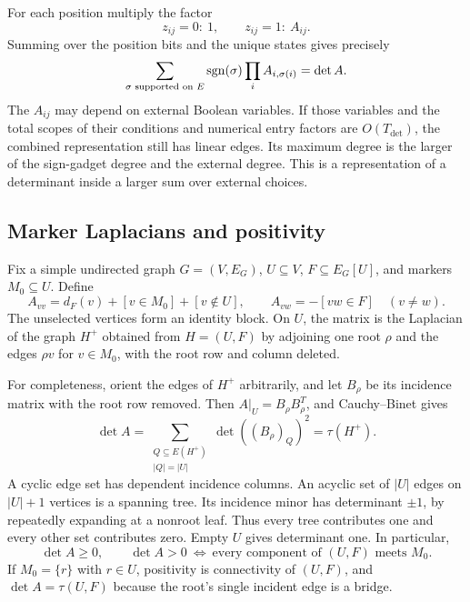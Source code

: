 For each position multiply the factor
\[
 z_{ij}=0:\ 1,\qquad z_{ij}=1:\ A_{ij}.
\]
Summing over the position bits and the unique states gives precisely
\begin{equation}\label{eq:sparse-det}
 \sum_{\sigma\text{ supported on }E}
    \operatorname{sgn}(\sigma)\prod_iA_{i,\sigma(i)}=\det A.
\end{equation}
The $A_{ij}$ may depend on external Boolean variables. If those
variables and the total scopes of their conditions and numerical
entry factors are $O(T_{\mathrm{det}})$, the combined representation
still has linear edges. Its maximum degree is the larger of the
sign-gadget degree and the external degree. This is a representation
of a determinant inside a larger sum over external choices.

\subsection{Marker Laplacians and positivity}
\label{subsec:matrix-tree}

Fix a simple undirected graph $G=(V,E_G)$, $U\subseteq V$,
$F\subseteq E_G[U]$, and markers $M_0\subseteq U$. Define
\begin{equation}\label{eq:marker-matrix}
 A_{vv}=d_F(v)+[v\in M_0]+[v\notin U],\qquad
 A_{vw}=-[vw\in F]\quad(v\ne w).
\end{equation}
The unselected vertices form an identity block. On $U$, the matrix
is the Laplacian of the graph $H^+$ obtained from $H=(U,F)$ by
adjoining one root $\rho$ and the edges $\rho v$ for $v\in M_0$,
with the root row and column deleted.

For completeness, orient the edges of $H^+$ arbitrarily, and let
$B_\rho$ be its incidence matrix with the root row removed.
Then $A|_U=B_\rho B_\rho^T$, and Cauchy--Binet gives
\begin{equation}\label{eq:matrix-tree}
 \det A=\sum_{\substack{Q\subseteq E(H^+)\\|Q|=|U|}}
            \det((B_\rho)_Q)^2=\tau(H^+).
\end{equation}
A cyclic edge set has dependent incidence columns. An acyclic set
of $|U|$ edges on $|U|+1$ vertices is a spanning tree. Its incidence
minor has determinant $\pm1$, by repeatedly expanding at a nonroot
leaf. Thus every tree contributes one and every other set contributes
zero. Empty $U$ gives determinant one. In particular,
\begin{equation}\label{eq:marker-positive}
 \det A\ge0,\qquad \det A>0
 \ \Longleftrightarrow\
 \text{every component of }(U,F)\text{ meets }M_0.
\end{equation}
If $M_0=\{r\}$ with $r\in U$, positivity is connectivity of $(U,F)$,
and $\det A=\tau(U,F)$ because the root's single incident edge is a
bridge.

